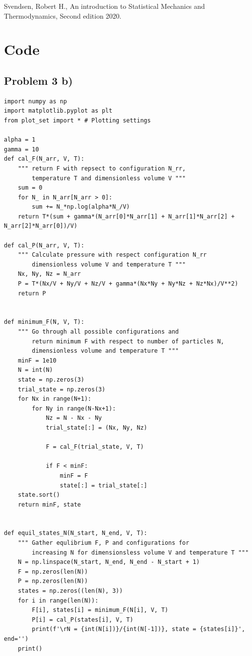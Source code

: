 \documentclass[reprint, amsmath, amssymb, aps, onecolumn]{revtex4-2}
\begin{document}
\begin{thebibliography}{}
   Svendsen, Robert H., An introduction to Statistical Mechanics and Thermodynamics, Second edition 2020.
\end{thebibliography}
\clearpage


\appendix
\section{Code}
\subsection{Problem 3 b)}\label{sec:code_3b}

\begin{verbatim}
import numpy as np
import matplotlib.pyplot as plt
from plot_set import * # Plotting settings

alpha = 1
gamma = 10
def cal_F(N_arr, V, T):
    """ return F with repsect to configuration N_rr,
        temperature T and dimensionless volume V """
    sum = 0
    for N_ in N_arr[N_arr > 0]:
        sum += N_*np.log(alpha*N_/V)
    return T*(sum + gamma*(N_arr[0]*N_arr[1] + N_arr[1]*N_arr[2] + N_arr[2]*N_arr[0])/V)

def cal_P(N_arr, V, T):
    """ Calculate pressure with respect configuration N_rr
        dimensionless volume V and temperature T """
    Nx, Ny, Nz = N_arr
    P = T*(Nx/V + Ny/V + Nz/V + gamma*(Nx*Ny + Ny*Nz + Nz*Nx)/V**2)
    return P


def minimum_F(N, V, T):
    """ Go through all possible configurations and
        return minimum F with respect to number of particles N,
        dimensionless volume and temperature T """
    minF = 1e10
    N = int(N)
    state = np.zeros(3)
    trial_state = np.zeros(3)
    for Nx in range(N+1):
        for Ny in range(N-Nx+1):
            Nz = N - Nx - Ny
            trial_state[:] = (Nx, Ny, Nz)

            F = cal_F(trial_state, V, T)

            if F < minF:
                minF = F
                state[:] = trial_state[:]
    state.sort()
    return minF, state


def equil_states_N(N_start, N_end, V, T):
    """ Gather equlibrium F, P and configurations for
        increasing N for dimensionsless volume V and temperature T """
    N = np.linspace(N_start, N_end, N_end - N_start + 1)
    F = np.zeros(len(N))
    P = np.zeros(len(N))
    states = np.zeros((len(N), 3))
    for i in range(len(N)):
        F[i], states[i] = minimum_F(N[i], V, T)
        P[i] = cal_P(states[i], V, T)
        print(f'\rN = {int(N[i])}/{int(N[-1])}, state = {states[i]}', end='')
    print()


\end{verbatim}
\end{document}
